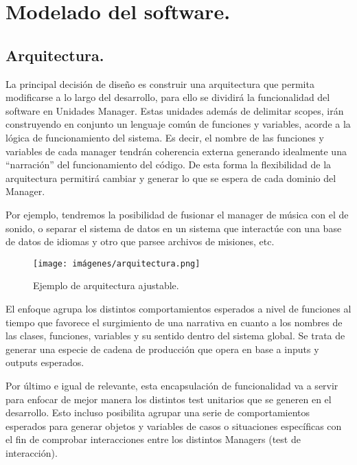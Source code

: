 
\section{Modelado del software.}\label{modelado:modelado-del-software}

\subsection{Arquitectura.}\label{modelado:arquitectura}
La principal decisión de diseño es construir una arquitectura que permita modificarse a lo largo del desarrollo, para ello se dividirá la funcionalidad del software en Unidades Manager. Estas unidades además de delimitar scopes, irán construyendo en conjunto un lenguaje común de funciones y variables, acorde a la lógica de funcionamiento del sistema. Es decir, el nombre de las funciones y variables de cada manager tendrán coherencia externa generando idealmente una “narración” del funcionamiento del código. De esta forma la flexibilidad de la arquitectura permitirá cambiar y generar lo que se espera de cada dominio del Manager.

Por ejemplo, tendremos la posibilidad de fusionar el manager de música con el de sonido, o separar el sistema de datos en un sistema que interactúe con una base de datos de idiomas y otro que parsee archivos de misiones, etc.

\begin{figure}[h]
	\centering
	\texttt{[image: imágenes/arquitectura.png]}
	\caption{Ejemplo de arquitectura ajustable.}
\end{figure}

El enfoque agrupa los distintos comportamientos esperados a nivel de funciones al tiempo que favorece el surgimiento de una narrativa en cuanto a los nombres de las clases, funciones, variables y su sentido dentro del sistema global. Se trata de generar una especie de cadena de producción que opera en base a inputs y outputs esperados.

Por último e igual de relevante, esta encapsulación de funcionalidad va a servir para enfocar de mejor manera los distintos test unitarios que se generen en el desarrollo. Esto incluso posibilita agrupar una serie de comportamientos esperados para generar objetos y variables de casos o situaciones específicas con el fin de comprobar interacciones entre los distintos Managers (test de interacción).

